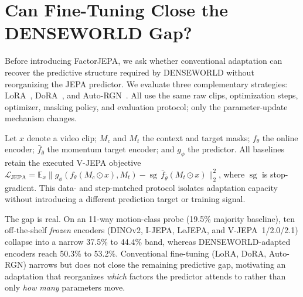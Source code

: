 





\section{Can Fine-Tuning Close the DENSEWORLD Gap?}
\label{sec:vjepa_adaptation_baselines}

Before introducing FactorJEPA, we ask whether conventional adaptation can recover the predictive structure required by DENSEWORLD without reorganizing the JEPA predictor. We evaluate three complementary strategies: LoRA~\cite{hu2022lora}, DoRA~\cite{liu2024dora}, and Auto-RGN~\cite{lee2023surgical}. All use the same raw clips, optimization steps, optimizer, masking policy, and evaluation protocol; only the parameter-update mechanism changes.

Let $x$ denote a video clip; $M_c$ and $M_t$ the context and target masks; $f_\theta$ the online encoder; $\bar f_{\bar\theta}$ the momentum target encoder; and $g_\phi$ the predictor. All baselines retain the executed V-JEPA objective~\cite{bardes2024vjepa} $\mathcal{L}_{\mathrm{JEPA}}=\mathbb{E}_{x}\big\|g_\phi(f_\theta(M_c\odot x),M_t)-\operatorname{sg}\,\bar f_{\bar\theta}(M_t\odot x)\big\|_2^2$, where $\operatorname{sg}$ is stop-gradient. This data- and step-matched protocol isolates adaptation capacity without introducing a different prediction target or training signal.

The gap is real. On an 11-way motion-class probe (19.5\% majority baseline), ten off-the-shelf \emph{frozen} encoders (DINOv2, I-JEPA, LeJEPA, and V-JEPA~1/2.0/2.1) collapse into a narrow 37.5\% to 44.4\% band, whereas DENSEWORLD-adapted encoders reach 50.3\% to 53.2\%. Conventional fine-tuning (LoRA, DoRA, Auto-RGN) narrows but does not close the remaining predictive gap, motivating an adaptation that reorganizes \emph{which} factors the predictor attends to rather than only \emph{how many} parameters move.



